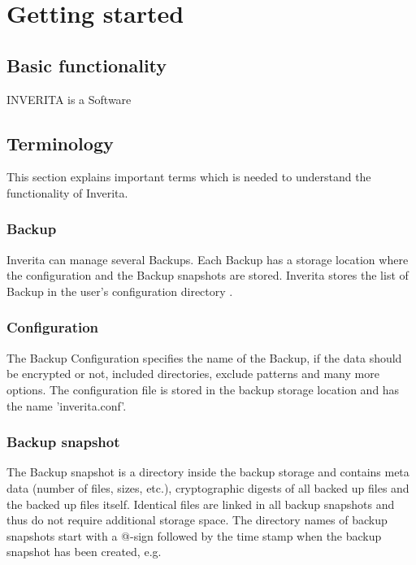 \chapter{Getting started}

\section{Basic functionality}

INVERITA is a Software


\section{Terminology}

This section explains important terms which is needed to understand
the functionality of Inverita.

\subsection{Backup}
   Inverita can manage several Backups. Each Backup has
         a storage location where the configuration and the
         Backup snapshots are stored.
         Inverita stores the list of Backup in the user's
         configuration directory .

\subsection{Configuration}
         The Backup Configuration specifies the name of the Backup,
         if the data should be encrypted or not, included
         directories, exclude patterns and many more options.
         The configuration file is stored in the backup storage
         location and has the name 'inverita.conf'.

\subsection{Backup snapshot}
         The Backup snapshot is a directory inside the
         backup storage and contains meta data (number of files, sizes, etc.),
         cryptographic digests of all backed up files and the backed up files itself.
         Identical files are linked in all backup snapshots and thus do not
         require additional storage space.
         The directory names of backup snapshots start with a @-sign followed by
         the time stamp when the backup snapshot has been created, e.g. 

